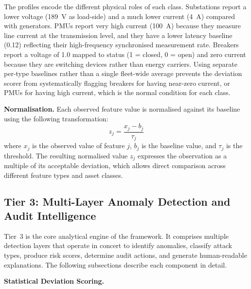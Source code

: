 \par \vspace{0.25cm}
\noindent
The profiles encode the different physical roles of each class. Substations report a lower voltage (189~V as load-side) and a much lower current (4~A) compared with generators. PMUs report very high current (100~A) because they measure line current at the transmission level, and they have a lower latency baseline (0.12) reflecting their high-frequency synchronised measurement rate. Breakers report a voltage of 1.0 mapped to status (1 = closed, 0 = open) and zero current because they are switching devices rather than energy carriers. Using separate per-type baselines rather than a single fleet-wide average prevents the deviation scorer from systematically flagging breakers for having near-zero current, or PMUs for having high current, which is the normal condition for each class.

\par \vspace{0.35cm}
\textbf{Normalisation.} Each observed feature value is normalised against its baseline using the following transformation:
\begin{equation}
z_{j} = \frac{x_{j} - b_{j}}{\tau_{j}}
\label{eq:normalisation}
\end{equation}
where $x_{j}$ is the observed value of feature $j$, $b_{j}$ is the baseline value, and $\tau_{j}$ is the threshold. The resulting normalised value $z_{j}$ expresses the observation as a multiple of its acceptable deviation, which allows direct comparison across different feature types and asset classes.

\subsection{Tier 3: Multi-Layer Anomaly Detection and Audit Intelligence}

Tier~3 is the core analytical engine of the framework. It comprises multiple detection layers that operate in concert to identify anomalies, classify attack types, produce risk scores, determine audit actions, and generate human-readable explanations. The following subsections describe each component in detail.

\par \vspace{0.35cm}
\textbf{Statistical Deviation Scoring.}

